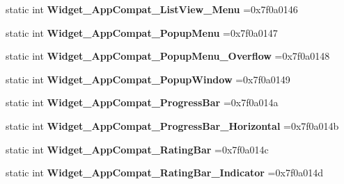 \begin{DoxyCompactItemize}
static int {\bfseries Widget\+\_\+\+App\+Compat\+\_\+\+List\+View\+\_\+\+Menu} =0x7f0a0146
\item 
\mbox{\label{classandroid_1_1support_1_1v7_1_1mediarouter_1_1R_1_1style_ac763e9d01968150cf2fbf010e1c7d14d}} 
static int {\bfseries Widget\+\_\+\+App\+Compat\+\_\+\+Popup\+Menu} =0x7f0a0147
\item 
\mbox{\label{classandroid_1_1support_1_1v7_1_1mediarouter_1_1R_1_1style_af040962da8fe984a8d515dae005947b8}} 
static int {\bfseries Widget\+\_\+\+App\+Compat\+\_\+\+Popup\+Menu\+\_\+\+Overflow} =0x7f0a0148
\item 
\mbox{\label{classandroid_1_1support_1_1v7_1_1mediarouter_1_1R_1_1style_aad6b35cdc6e9c9debd8074fd46ff0490}} 
static int {\bfseries Widget\+\_\+\+App\+Compat\+\_\+\+Popup\+Window} =0x7f0a0149
\item 
\mbox{\label{classandroid_1_1support_1_1v7_1_1mediarouter_1_1R_1_1style_aca9a44b28d57865d48321acf78bd5ef4}} 
static int {\bfseries Widget\+\_\+\+App\+Compat\+\_\+\+Progress\+Bar} =0x7f0a014a
\item 
\mbox{\label{classandroid_1_1support_1_1v7_1_1mediarouter_1_1R_1_1style_aff6e857f90a5ad7fbe6100fa8a887b57}} 
static int {\bfseries Widget\+\_\+\+App\+Compat\+\_\+\+Progress\+Bar\+\_\+\+Horizontal} =0x7f0a014b
\item 
\mbox{\label{classandroid_1_1support_1_1v7_1_1mediarouter_1_1R_1_1style_aa347ffedfae6f48ffb22a820d6fb8583}} 
static int {\bfseries Widget\+\_\+\+App\+Compat\+\_\+\+Rating\+Bar} =0x7f0a014c
\item 
\mbox{\label{classandroid_1_1support_1_1v7_1_1mediarouter_1_1R_1_1style_a051aef1addfd529a3642f049aee59715}} 
static int {\bfseries Widget\+\_\+\+App\+Compat\+\_\+\+Rating\+Bar\+\_\+\+Indicator} =0x7f0a014d
\item 
\mbox{\label{classandroid_1_1support_1_1v7_1_1mediarouter_1_1R_1_1style_aac39f818a6691913594b6862db7bcf26}} 

\end{DoxyCompactItemize}
